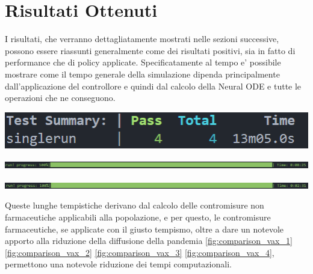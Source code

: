 \section{Risultati Ottenuti}
I risultati, che verranno dettagliatamente mostrati nelle sezioni successive, possono essere riassunti generalmente
come dei risultati positivi, sia in fatto di performance che di policy applicate. Specificatamente 
al tempo e' possibile mostrare come il tempo generale della simulazione dipenda principalmente dall'applicazione
del controllore e quindi dal calcolo della Neural ODE e tutte le operazioni che ne conseguono. 

\begin{minipage}{\linewidth}
	\centering
	\includegraphics[width=\textwidth]{img/tt_singlerun.png}
	\label{fig:tt_singlerun}
\end{minipage}

\begin{minipage}{\linewidth}
	\centering
	\includegraphics[width=\textwidth]{img/tt_singlerun_control.png}
	\label{fig:tt_singlerun_control}
\end{minipage}

\begin{minipage}{\linewidth}
	\centering
	\includegraphics[width=\textwidth]{img/tt_singlerun_all.png}
	\label{fig:tt_singlerun_all}
\end{minipage}

Queste lunghe tempistiche derivano dal calcolo delle contromisure non farmaceutiche applicabili alla popolazione, 
e per questo, le contromisure farmaceutiche, se applicate con il giusto tempismo, oltre a dare un notevole 
apporto alla riduzione della diffusione della pandemia \ref{fig:comparison_vax_1} \ref{fig:comparison_vax_2}
\ref{fig:comparison_vax_3} \ref{fig:comparison_vax_4}, permettono una notevole riduzione dei tempi computazionali.
\newpage


